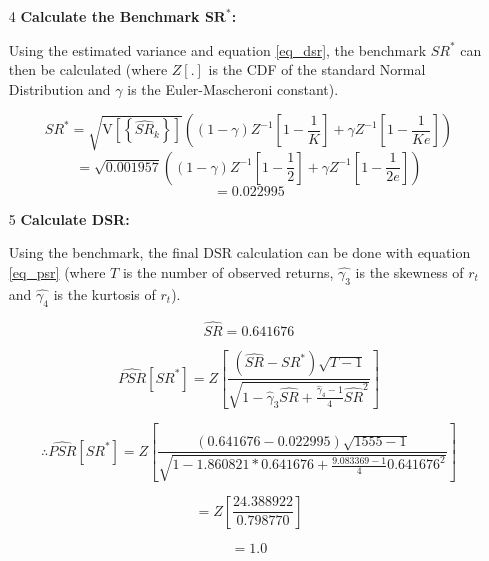 \documentclass[a4paper,11pt,oneside]{article}
\theoremstyle{plain}
\theoremstyle{definition}
\begin{document}
\begin{itemize}
		\item [4] \textbf{Calculate the Benchmark $\mathbf{SR^*}$:} \newline
		
		Using the estimated variance and equation \eqref{eq_dsr}, the benchmark $SR^*$ can then be calculated (where $Z[.]$ is the CDF of the standard Normal Distribution 
		and $\gamma$ is the Euler-Mascheroni constant).
		
		\begin{equation}
		S R^{*}=\sqrt{\mathrm{V}\left[\left\{\widehat{S R}_{k}\right\}\right]}\left((1-\gamma) Z^{-1}\left[1-\frac{1}{K}\right]+\gamma Z^{-1}\left[1-\frac{1}{K e}\right]\right)
		\end{equation}
		\begin{equation}
		=\sqrt{{0.001957}}\left((1-\gamma) Z^{-1}\left[1-\frac{1}{2}\right]+\gamma Z^{-1}\left[1-\frac{1}{2 e}\right]\right)
		\end{equation}
		\begin{equation}
		=0.022995
		\end{equation}
		
		\item [5] \textbf{Calculate DSR:} \newline
		
		Using the benchmark, the final DSR calculation can be done with equation \eqref{eq_psr} (where $T$ is the number of observed returns, $\hat{\gamma_3}$ is the skewness of $r_t$ and $\hat{\gamma_4}$ is the kurtosis of $r_t$).
		
		\begin{equation}
		\widehat{SR}=0.641676
		\end{equation}
		
		\begin{equation}
		\widehat{P S R}\left[S R^{*}\right]=Z\left[\frac{\left(\widehat{S R}-S R^{*}\right) \sqrt{T-1}}{\sqrt{1-\hat{\gamma}_{3} \widehat{S R}+\frac{\hat{\gamma}_{4}-1}{4} \widehat{S R}^{2}}}\right]
		\end{equation}
		
		\begin{equation}
		\therefore \widehat{P S R}\left[S R^{*}\right] =Z\left[\frac{\left({0.641676}-{0.022995}\right) \sqrt{1555-1}}{\sqrt{1-{1.860821}\ast{0.641676}+\frac{{9.083369}-1}{4}{0.641676}^{2}}}\right]
		\end{equation}
		
		\begin{equation}
		=Z\left[\frac{24.388922}{0.798770}\right]
		\end{equation}
		
		\begin{equation}
		= {1.0}
		\end{equation}
		
		
	\end{itemize}
	
\end{document}
